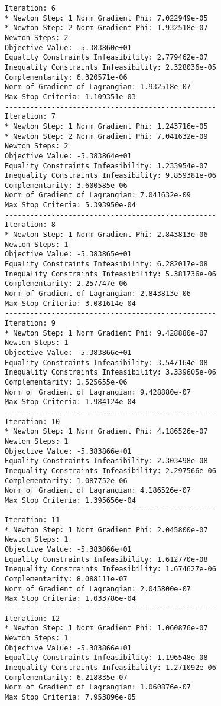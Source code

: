 \documentclass{article}
\begin{document}
\begin{minipage}[t]{0.45\textwidth}
\begin{verbatim}
Iteration: 6
* Newton Step: 1 Norm Gradient Phi: 7.022949e-05
* Newton Step: 2 Norm Gradient Phi: 1.932518e-07
Newton Steps: 2
Objective Value: -5.383860e+01
Equality Constraints Infeasibility: 2.779462e-07
Inequality Constraints Infeasibility: 2.328036e-05
Complementarity: 6.320571e-06
Norm of Gradient of Lagrangian: 1.932518e-07
Max Stop Criteria: 1.109351e-03
--------------------------------------------------
Iteration: 7
* Newton Step: 1 Norm Gradient Phi: 1.243716e-05
* Newton Step: 2 Norm Gradient Phi: 7.041632e-09
Newton Steps: 2
Objective Value: -5.383864e+01
Equality Constraints Infeasibility: 1.233954e-07
Inequality Constraints Infeasibility: 9.859381e-06
Complementarity: 3.600585e-06
Norm of Gradient of Lagrangian: 7.041632e-09
Max Stop Criteria: 5.393950e-04
--------------------------------------------------
Iteration: 8
* Newton Step: 1 Norm Gradient Phi: 2.843813e-06
Newton Steps: 1
Objective Value: -5.383865e+01
Equality Constraints Infeasibility: 6.282017e-08
Inequality Constraints Infeasibility: 5.381736e-06
Complementarity: 2.257747e-06
Norm of Gradient of Lagrangian: 2.843813e-06
Max Stop Criteria: 3.081614e-04
--------------------------------------------------
Iteration: 9
* Newton Step: 1 Norm Gradient Phi: 9.428880e-07
Newton Steps: 1
Objective Value: -5.383866e+01
Equality Constraints Infeasibility: 3.547164e-08
Inequality Constraints Infeasibility: 3.339605e-06
Complementarity: 1.525655e-06
Norm of Gradient of Lagrangian: 9.428880e-07
Max Stop Criteria: 1.984124e-04
--------------------------------------------------
Iteration: 10
* Newton Step: 1 Norm Gradient Phi: 4.186526e-07
Newton Steps: 1
Objective Value: -5.383866e+01
Equality Constraints Infeasibility: 2.303498e-08
Inequality Constraints Infeasibility: 2.297566e-06
Complementarity: 1.087752e-06
Norm of Gradient of Lagrangian: 4.186526e-07
Max Stop Criteria: 1.395656e-04
--------------------------------------------------
Iteration: 11
* Newton Step: 1 Norm Gradient Phi: 2.045800e-07
Newton Steps: 1
Objective Value: -5.383866e+01
Equality Constraints Infeasibility: 1.612770e-08
Inequality Constraints Infeasibility: 1.674627e-06
Complementarity: 8.088111e-07
Norm of Gradient of Lagrangian: 2.045800e-07
Max Stop Criteria: 1.033786e-04
--------------------------------------------------
Iteration: 12
* Newton Step: 1 Norm Gradient Phi: 1.060876e-07
Newton Steps: 1
Objective Value: -5.383866e+01
Equality Constraints Infeasibility: 1.196548e-08
Inequality Constraints Infeasibility: 1.271092e-06
Complementarity: 6.218835e-07
Norm of Gradient of Lagrangian: 1.060876e-07
Max Stop Criteria: 7.953896e-05
\end{verbatim}
\end{minipage}
\end{document}

